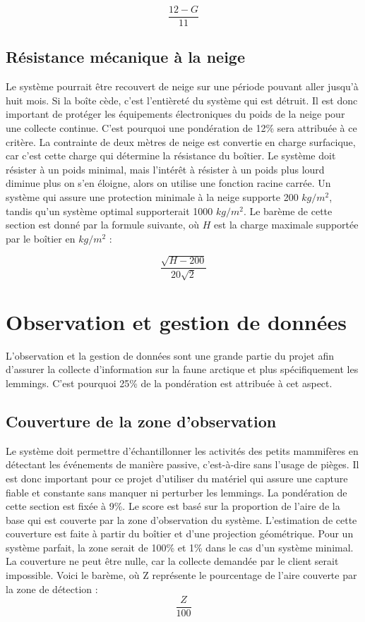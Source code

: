 \begin{equation}
    \frac{12-G}{11}
\end{equation}

\subsection{Résistance mécanique à la neige}
\label{resistance_neige}
Le système pourrait être recouvert de neige sur une période pouvant aller jusqu'à huit mois.
Si la boîte cède, c’est l’entièreté du système qui est détruit.
Il est donc important de protéger les équipements électroniques du poids de la neige pour une collecte continue.
C'est pourquoi une pondération de 12\% sera attribuée à ce critère.
La contrainte de deux mètres de neige est convertie en charge surfacique, car c'est cette charge qui détermine la résistance du boîtier.
Le système doit résister à un poids minimal, mais l'intérêt à résister à un poids plus lourd diminue plus on s'en éloigne, alors on utilise une fonction racine carrée.
Un système qui assure une protection minimale à la neige supporte 200 $kg/m^2$, tandis qu'un système optimal supporterait 1000 $kg/m^2$.
Le barème de cette section est donné par la formule suivante, où $H$ est la charge maximale supportée par le boîtier en $kg/m^2$ :

\begin{equation}
    \frac{\sqrt{H - 200}}{20\sqrt{2}}
\end{equation}

\section{Observation et gestion de données}
\label{donnees}
L’observation et la gestion de données sont une grande partie du projet afin d’assurer la collecte d’information sur la faune arctique et plus spécifiquement les lemmings. C’est pourquoi 25\% de la pondération est attribuée à cet aspect.

\subsection{Couverture de la zone d'observation}
\label{detection_mammiferes}
Le système doit permettre d’échantillonner les activités des petits mammifères en détectant les événements de manière passive, c’est-à-dire sans l’usage de pièges.
Il est donc important pour ce projet d’utiliser du matériel qui assure une capture fiable et constante sans manquer ni perturber les lemmings.
La pondération de cette section est fixée à 9\%.
Le score est basé sur la proportion de l’aire de la base qui est couverte par la zone d’observation du système.
L'estimation de cette couverture est faite à partir du boîtier et d'une projection géométrique.
Pour un système parfait, la zone serait de 100\% et 1\% dans le cas d'un système minimal.
La couverture ne peut être nulle, car la collecte demandée par le client serait impossible.
Voici le barème, où Z représente le pourcentage de l’aire couverte par la zone de détection :
\begin{equation}
    \frac{Z}{100}
\end{equation}

